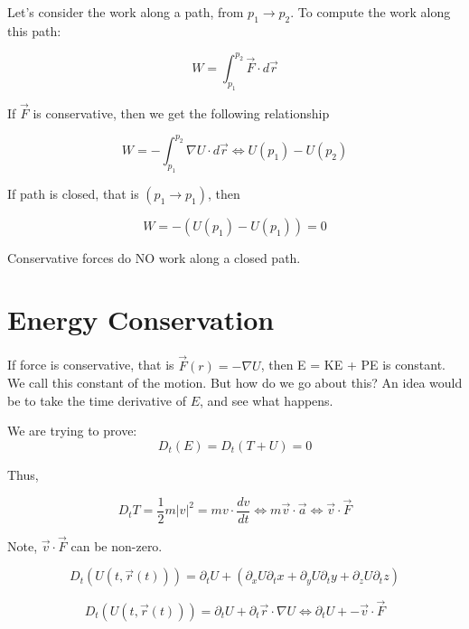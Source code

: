 \documentclass{article}
\newtheorem{one minute paper}[theorem]{One Minute Paper}
\begin{document}
Let's consider the work along a path, from $p_1 \rightarrow p_2$. To compute the work along this path:

\begin{equation}
    W = \int_{p_1}^{p_2}\vec{F} \cdot d\vec{r}
\end{equation}

If $\vec{F}$ is conservative, then we get the following relationship

\begin{equation}
    W = -\int_{p_1}^{p_2}\nabla U \cdot d\vec{r} \iff U(p_1) - U(p_2)
\end{equation}

If path is closed, that is $(p_1 \rightarrow p_1)$, then 

\begin{equation}
    W = -(U(p_1) - U(p_1)) = 0
\end{equation}

Conservative forces do NO work along a closed path.

\section*{Energy Conservation}

If force is conservative, that is $\vec{F}(r) = -\nabla U$, then E = KE + PE is constant. We call this constant of the motion. But how do we go about this?
An idea would be to take the time derivative of $E$, and see what happens. 

We are trying to prove:
\begin{equation}
    D_t(E) = D_t(T + U) = 0
\end{equation}

Thus,

\begin{equation}
    D_t T = \frac{1}{2}m|v|^2 = mv\cdot \frac{dv}{dt} \iff m\vec{v} \cdot \vec{a} \iff \vec{v} \cdot \vec{F}
\end{equation}

Note, $\vec{v} \cdot \vec{F}$ can be non-zero.

\begin{equation}
    D_t(U(t,\vec{r}(t))) = \partial_t U + (\partial_x U \partial_t x + \partial_y U \partial_t y + \partial_z U \partial_t z)
\end{equation}

\begin{equation}
    D_t(U(t,\vec{r}(t))) = \partial_t U + \partial_t \vec{r} \cdot \nabla U \iff \partial_t U + -\vec{v} \cdot \vec{F}
\end{equation}
\end{document}

